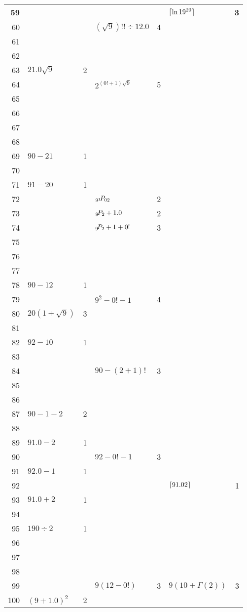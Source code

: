 \begin{longtable}{r l r l r l r}
59 & & & & & $\lceil\ln 19^{20}\rceil$ & 3 \\ \midrule
\midrule
60 & & & $(\sqrt{9})!!\div12.0$ & 4 \\ \midrule
61 & & \\ \midrule
62 & & \\ \midrule
63 & $21.0\sqrt{9}$ & 2 \\ \midrule
64 & & & $2^{(0!+1)\sqrt{9}}$ & 5 \\ \midrule
65 & & \\ \midrule
66 & & \\ \midrule
67 & & \\ \midrule
68 & & \\ \midrule
69 & $90-21$ & 1 \\ \midrule
\midrule
70 & & \\ \midrule
71 & $91-20$ & 1 \\ \midrule
72 & & & ${{}_{9^1}\mkern-3muP_{02}}$ & 2 \\ \midrule
73 & & & ${{}_{9}\mkern-3muP_{2}}+1.0$ & 2 \\ \midrule
74 & & & ${{}_{9}\mkern-3muP_{2}}+1+0!$ & 3\\ \midrule
75 & & \\ \midrule
76 & & & \\ \midrule
77 & & \\ \midrule
78 & $90-12$ & 1 \\ \midrule
79 & & & $9^2-0!-1$ & 4 \\ \midrule
\midrule
80 & $20(1+\sqrt{9})$ & 3 \\ \midrule
81 & & \\ \midrule
82 & $92-10$ & 1 \\ \midrule
83 & & \\ \midrule
84 & & & $90-(2+1)!$ & 3 \\ \midrule
85 & & \\ \midrule
86 & & \\ \midrule
87 & $90-1-2$ & 2 \\ \midrule
88 & & \\ \midrule
89 & $91.0-2$ & 1 \\ \midrule
\midrule
90 & & & $92-0!-1$ & 3 \\ \midrule
91 & $92.0-1$ & 1 \\ \midrule
92 & & & & & $\lceil91.02\rceil$ & 1 \\ \midrule
93 & $91.0+2$ & 1 \\ \midrule
94 & & \\ \midrule
95 & $190\div2$ & 1 \\ \midrule
96 & & \\ \midrule
97 & & \\ \midrule
98 & & \\ \midrule
99 & & & $9(12-0!)$ & 3 & $9(10+\Gamma(2))$ & 3  \\ \midrule
\midrule
100 & ${(9+1.0)}^{2}$ & 2 \\ \bottomrule
\end{longtable}